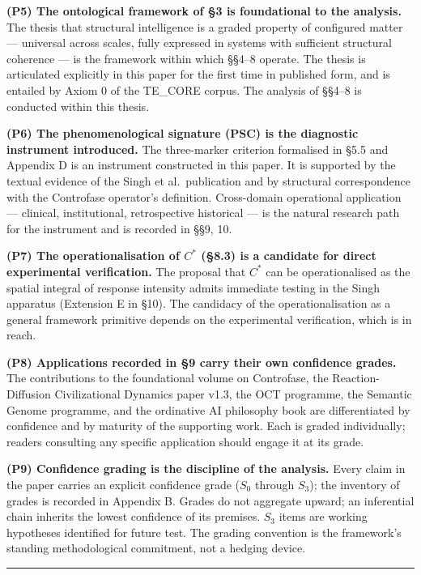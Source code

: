 \documentclass[
  11pt,
  a4paper,
]{article}
\begin{document}
\textbf{(P5) The ontological framework of §3 is foundational to the
analysis.} The thesis that structural intelligence is a graded property
of configured matter --- universal across scales, fully expressed in
systems with sufficient structural coherence --- is the framework within
which §§4--8 operate. The thesis is articulated explicitly in this paper
for the first time in published form, and is entailed by Axiom 0 of the
TE\_CORE corpus. The analysis of §§4--8 is conducted within this thesis.

\textbf{(P6) The phenomenological signature (PSC) is the diagnostic
instrument introduced.} The three-marker criterion formalised in §5.5
and Appendix D is an instrument constructed in this paper. It is
supported by the textual evidence of the Singh et al.~publication and by
structural correspondence with the Controfase operator's definition.
Cross-domain operational application --- clinical, institutional,
retrospective historical --- is the natural research path for the
instrument and is recorded in §§9, 10.

\textbf{(P7) The operationalisation of \(C^*\) (§8.3) is a candidate for
direct experimental verification.} The proposal that \(C^*\) can be
operationalised as the spatial integral of response intensity admits
immediate testing in the Singh apparatus (Extension E in §10). The
candidacy of the operationalisation as a general framework primitive
depends on the experimental verification, which is in reach.

\textbf{(P8) Applications recorded in §9 carry their own confidence
grades.} The contributions to the foundational volume on Controfase, the
Reaction-Diffusion Civilizational Dynamics paper v1.3, the OCT
programme, the Semantic Genome programme, and the ordinative AI
philosophy book are differentiated by confidence and by maturity of the
supporting work. Each is graded individually; readers consulting any
specific application should engage it at its grade.

\textbf{(P9) Confidence grading is the discipline of the analysis.}
Every claim in the paper carries an explicit confidence grade (\(S_0\)
through \(S_3\)); the inventory of grades is recorded in Appendix B.
Grades do not aggregate upward; an inferential chain inherits the lowest
confidence of its premises. \(S_3\) items are working hypotheses
identified for future test. The grading convention is the framework's
standing methodological commitment, not a hedging device.

\begin{center}\rule{0.5\linewidth}{0.5pt}\end{center}
\end{document}
